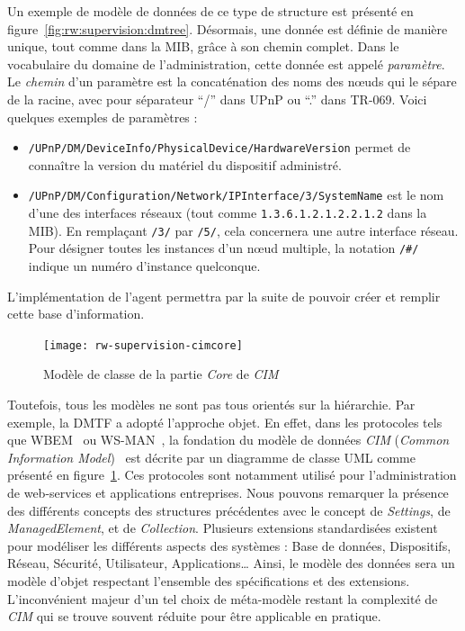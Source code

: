 Un exemple de modèle de données de ce type de structure est présenté en figure~\ref{fig:rw:supervision:dmtree}. Désormais, une donnée est définie de manière unique, tout comme dans la MIB, grâce à son chemin complet. Dans le vocabulaire du domaine de l'administration, cette donnée est appelé \textit{paramètre}. Le \textit{chemin} d'un paramètre est la concaténation des noms des nœuds qui le sépare de la racine, avec pour séparateur \enquote{/} dans UPnP ou \enquote{.} dans TR-069. Voici quelques exemples de paramètres :
\begin{itemize}
\item \verb|/UPnP/DM/DeviceInfo/PhysicalDevice/HardwareVersion| permet de connaître la version du matériel du dispositif administré. 
\item \verb|/UPnP/DM/Configuration/Network/IPInterface/3/SystemName| est le nom d'une des interfaces réseaux (tout comme \verb|1.3.6.1.2.1.2.2.1.2| dans la MIB). En remplaçant \verb|/3/| par \verb|/5/|, cela concernera une autre interface réseau. Pour désigner toutes les instances d'un nœud multiple, la notation \verb|/#/| indique un numéro d'instance quelconque.
\end{itemize}

L'implémentation de l'agent permettra par la suite de pouvoir créer et remplir cette base d'information.

\begin{figure}[ht]
    \centering
    \texttt{[image: rw-supervision-cimcore]}
    \caption{Modèle de classe de la partie \textit{Core} de \textit{CIM}}\label{fig:rw:supervision:cimcore}
\end{figure}
Toutefois, tous les modèles ne sont pas tous orientés sur la hiérarchie. Par exemple, la DMTF a adopté l'approche objet. En effet, dans les protocoles tels que WBEM~\cite{DMTF:WBEM} ou WS-MAN~\cite{DMTF:WS-MAN}, la fondation du modèle de données \textit{CIM} (\textit{Common Information Model})~\cite{DMTF:CIM} est décrite par un diagramme de classe UML comme présenté en figure~\ref{fig:rw:supervision:cimcore}. Ces protocoles sont notamment utilisé pour l'administration de web-services et applications entreprises. Nous pouvons remarquer la présence des différents concepts des structures précédentes avec le concept de \textit{Settings}, de \textit{ManagedElement}, et de \textit{Collection}. Plusieurs extensions standardisées existent pour modéliser les différents aspects des systèmes : Base de données, Dispositifs, Réseau, Sécurité, Utilisateur, Applications\dots{} Ainsi, le modèle des données sera un modèle d'objet respectant l'ensemble des spécifications et des extensions. L'inconvénient majeur d'un tel choix de méta-modèle restant la complexité de \textit{CIM} qui se trouve souvent réduite pour être applicable en pratique.

